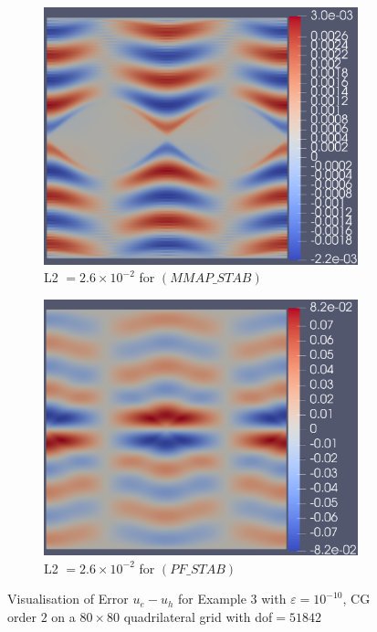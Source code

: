 \documentclass[12pt]{ociamthesis}
\begin{document}
\begin{figure}[H]
 \begin{subfigure}{0.5\textwidth}
     \includegraphics[width=\textwidth]{Pics/ErrorPlots/E3_MMAP_STAB.png}
     \caption{L2 $=2.6\times10^{-2}$ for $(MMAP\_STAB)$}
 \end{subfigure}
   \begin{subfigure}{0.5\textwidth}
     \includegraphics[width=\textwidth]{Pics/ErrorPlots/E3_PF_STAB.png}
     \caption{L2 $=2.6\times10^{-2}$ for $(PF\_STAB)$}
 \end{subfigure}
 \caption{Visualisation of Error $u_e-u_h$ for Example $3$ with $\varepsilon = 10^{-10}$, CG order $2$ on a $80 \times 80$ quadrilateral grid with dof$=51842$} \label{E3_Error}
\end{figure}
\end{document}
